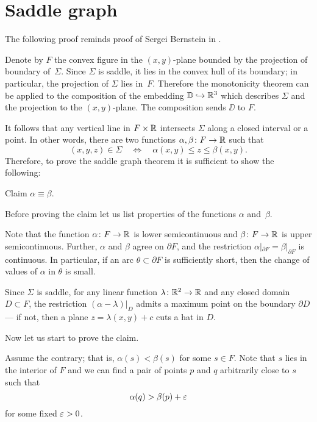 \documentclass{article}
\begin{document}
\section{Saddle graph}

The following proof reminds proof of Sergei Bernstein in \cite{bernstein}.

Denote by $F$ the convex figure in the $(x,y)$-plane bounded by the projection of boundary of~$\Sigma$.
Since $\Sigma$ is saddle, it lies in the convex hull of its boundary;
in particular, the projection of $\Sigma$ lies in~$F$.
Therefore the monotonicity theorem can be applied to the composition of the embedding $\mathbb{D}\hookrightarrow \mathbb{R}^3$ which describes $\Sigma$ and the projection
to the $(x,y)$-plane. The composition sends $\DD$ to $F$.

It follows that any vertical line in $F\times \mathbb{R}$ intersects $\Sigma$ along a closed interval or a point.
In other words, there are two functions $\alpha,\beta\colon F\to \mathbb{R}$
such that 
\[(x,y,z)\in \Sigma
\quad\iff\quad
\alpha(x,y)\le z\le \beta(x,y).\]
Therefore, to prove the saddle graph theorem it is sufficient to show the following:

\begin{thm}{Claim}
$\alpha\equiv \beta$.
\end{thm}

Before proving the claim let us list properties of the functions $\alpha$ and~$\beta$. 

Note that the function $\alpha\colon F\to \mathbb{R}$ is lower semicontinuous
and $\beta\colon F\to \mathbb{R}$ is upper semicontinuous.
Further, $\alpha$ and $\beta$ agree on $\partial F$, and the 
restriction $\alpha|_{\partial F}=\beta|_{\partial F}$ is continuous.
In particular, if an arc $\theta\subset \partial F$ is sufficiently short, then
the change of values of $\alpha$ in $\theta$ is small.

Since $\Sigma$ is saddle, for any linear function $\lambda\colon\mathbb{R}^2\to\mathbb{R}$ and any closed domain $D\subset F$, 
the restriction $(\alpha-\lambda)|_D$ admits a maximum point on the boundary $\partial D$ --- if not, then a plane $z=\lambda(x,y)+c$ cuts a hat in $D$.

Now let us start to prove the claim.

Assume the contrary; that is, $\alpha(s)<\beta(s)$ for some $s\in F$.
Note that $s$ lies in the interior of $F$ and we can find a pair of points $p$ and $q$ arbitrarily close to $s$
such that 
\[\alpha(q)>\beta(p)+\varepsilon\]
for some fixed $\varepsilon>0$.
\end{document}
